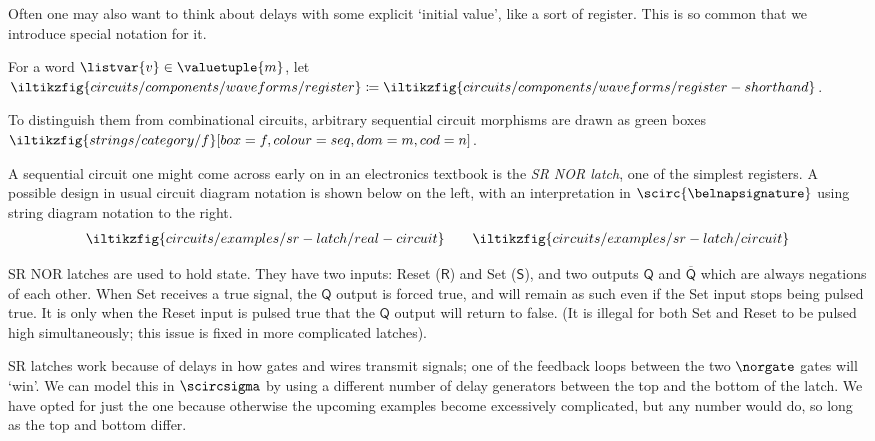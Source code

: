 \documentclass{lmcs}
\begin{document}
Often one may also want to think about delays with some explicit `initial
value', like a sort of register.
This is so common that we introduce special notation for it.

\begin{nota}[Register]\label{not:register}
    For a word \(\listvar{v} \in \valuetuple{m}\), let \(
    \iltikzfig{circuits/components/waveforms/register}
    \coloneqq
    \iltikzfig{circuits/components/waveforms/register-shorthand}
    \).
\end{nota}

To distinguish them from combinational circuits, arbitrary sequential circuit
morphisms are drawn as green boxes \(
\iltikzfig{strings/category/f}[box=f,colour=seq,dom=m,cod=n]
\).

\begin{exa}[SR latch]\label{ex:sr-latch}
    A sequential circuit one might come across early on in an electronics
    textbook is the \emph{SR NOR latch}, one of the simplest registers.
    A possible design in usual circuit diagram notation is shown below on the
    left, with an interpretation in \(\scirc{\belnapsignature}\) using string
    diagram notation to the right.
    \begin{gather*}
        \iltikzfig{circuits/examples/sr-latch/real-circuit}
        \qquad
        \iltikzfig{circuits/examples/sr-latch/circuit}
    \end{gather*}

    SR NOR latches are used to hold state.
    They have two inputs: Reset (\(\mathsf{R}\)) and Set (\(\mathsf{S}\)), and
    two outputs \(\mathsf{Q}\) and \(\overline{\mathsf{Q}}\) which are always
    negations of each other.
    When Set receives a true signal, the \(\mathsf{Q}\) output is forced true,
    and will remain as such even if the Set input stops being pulsed true.
    It is only when the Reset input is pulsed true that the \(\mathsf{Q}\)
    output will return to false.
    (It is illegal for both Set and Reset to be pulsed high simultaneously; this
    issue is fixed in more complicated latches).

    SR latches work because of delays in how gates and wires transmit signals;
    one of the feedback loops between the two \(\norgate\) gates will `win'.
    We can model this in \(\scircsigma\) by using a different number of delay
    generators between the top and the bottom of the latch.
    We have opted for just the one because otherwise the upcoming examples
    become excessively complicated, but any number would do, so long as the top
    and bottom differ.
\end{exa}
\end{document}
